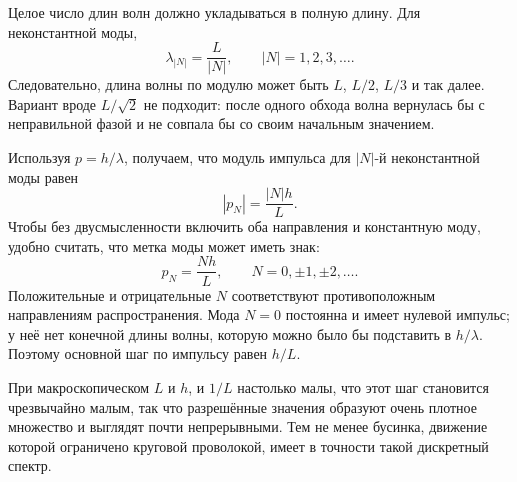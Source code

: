 Целое число длин волн должно укладываться в полную длину. Для неконстантной моды,
\begin{equation}
\lambda_{|N|}=\frac{L}{|N|},
\qquad |N|=1,2,3,\ldots .
\end{equation}
Следовательно, длина волны по модулю может быть \(L\), \(L/2\), \(L/3\) и так далее. Вариант вроде \(L/\sqrt{2}\) не подходит: после одного обхода волна вернулась бы с неправильной фазой и не совпала бы со своим начальным значением.

Используя \(p=h/\lambda\), получаем, что модуль импульса для \(|N|\)-й неконстантной моды равен
\begin{equation}
|p_N|=\frac{|N|h}{L}.
\end{equation}
Чтобы без двусмысленности включить оба направления и константную моду, удобно считать, что метка моды может иметь знак:
\begin{equation}
p_N=\frac{Nh}{L},
\qquad N=0,\pm1,\pm2,\ldots .
\end{equation}
Положительные и отрицательные \(N\) соответствуют противоположным направлениям распространения. Мода \(N=0\) постоянна и имеет нулевой импульс; у неё нет конечной длины волны, которую можно было бы подставить в \(h/\lambda\). Поэтому основной шаг по импульсу равен \(h/L\).

При макроскопическом \(L\) и \(h\), и \(1/L\) настолько малы, что этот шаг становится чрезвычайно малым, так что разрешённые значения образуют очень плотное множество и выглядят почти непрерывными. Тем не менее бусинка, движение которой ограничено круговой проволокой, имеет в точности такой дискретный спектр.

\begin{classroomqa}
\end{classroomqa}

\begin{classroomqa}
\end{classroomqa}

